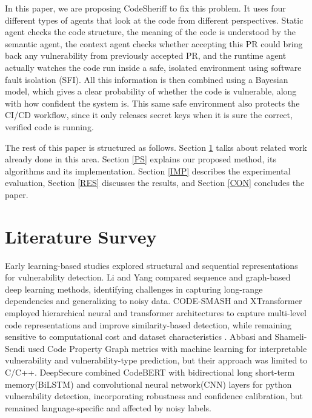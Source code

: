 \documentclass[conference]{IEEEtran}
\begin{document}
In this paper, we are proposing CodeSheriff to fix this problem. It uses four different types of agents that look at the code from different perspectives. Static agent checks the code structure, the meaning of the code is understood by the semantic agent, the context agent checks whether accepting this PR could bring back any vulnerability from previously accepted PR, and the runtime agent actually watches the code run inside a safe, isolated environment using software fault isolation (SFI). All this information is then combined using a Bayesian model, which gives a clear probability of whether the code is vulnerable, along with how confident the system is. This same safe environment also protects the CI/CD workflow, since it only releases secret keys when it is sure the correct, verified code is running.


The rest of this paper is structured as follows. Section \ref{LS} talks about related work already done in this area. Section \ref{PS} explains our proposed method, its algorithms and its implementation. Section \ref{IMP} describes the experimental evaluation, Section \ref{RES} discusses the results, and Section \ref{CON} concludes the paper.

\section{Literature Survey} \label{LS}

Early learning-based studies explored structural and sequential representations for vulnerability detection. Li and Yang \cite{ref20} compared sequence and graph-based deep learning methods, identifying challenges in capturing long-range dependencies and generalizing to noisy data. CODE-SMASH \cite{ref19} and XTransformer \cite{ref18} employed hierarchical neural and transformer architectures to capture multi-level code representations and improve similarity-based detection, while remaining sensitive to computational cost and dataset characteristics . Abbasi and Shameli-Sendi \cite{ref4} used Code Property Graph metrics with machine learning for interpretable vulnerability and vulnerability-type prediction, but their approach was limited to C/C++. DeepSecure \cite{ref2} combined CodeBERT with bidirectional long short-term memory(BiLSTM) and convolutional neural network(CNN) layers for python vulnerability detection, incorporating robustness and confidence calibration, but remained language-specific and affected by noisy labels.
\end{document}
